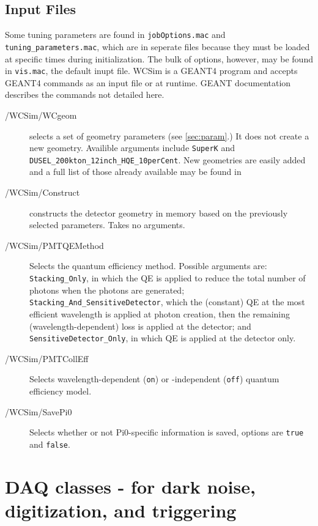  

\subsection{Input Files}

Some tuning parameters are found in \texttt{jobOptions.mac} and \texttt{tuning\_parameters.mac}, which are in seperate files because they must be loaded at specific times during initialization.  The bulk of options, however, may be found in \texttt{vis.mac}, the default inupt file.  WCSim is a GEANT4 program  and accepts GEANT4 commands as an input file or at runtime.  GEANT documentation describes the commands not detailed here.
\begin{description}
\item[/WCSim/WCgeom] selects a set of geometry parameters (see \ref{sec:param}.)  It does not create a new geometry.  Availible arguments include \texttt{SuperK} and \texttt{DUSEL\_200kton\_12inch\_HQE\_10perCent}.  New geometries are easily added and a full list of those already available may be found in 
\item[/WCSim/Construct] constructs the detector geometry in memory based on the previously selected parameters.  Takes no arguments.
\item[/WCSim/PMTQEMethod] Selects the quantum efficiency method. Possible arguments are: \texttt{Stacking\_Only}, in which the QE is applied to reduce the total number of photons when the photons are generated; \texttt{Stacking\_And\_SensitiveDetector}, which the (constant) QE at the most efficient wavelength is applied at photon creation, then the remaining (wavelength-dependent) loss is applied at the detector; and \texttt{SensitiveDetector\_Only}, in which QE is applied at the detector only.
\item[/WCSim/PMTCollEff] Selects wavelength-dependent (\texttt{on}) or -independent (\texttt{off}) quantum efficiency model.
\item[/WCSim/SavePi0] Selects whether or not Pi0-specific information is saved, options are \texttt{true} and \texttt{false}.

\end{description}



\section{DAQ classes - for dark noise, digitization, and triggering}

